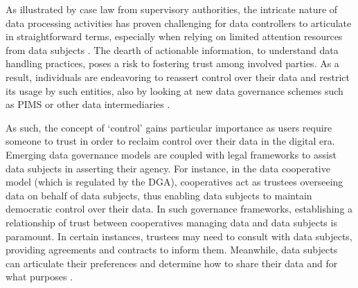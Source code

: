 As illustrated by case law from supervisory authorities, the intricate nature of data processing activities has proven challenging for data controllers to articulate in straightforward terms, especially when relying on limited attention resources from data subjects \citep{european_data_protection_board_guidelines_2020}.
The dearth of actionable information, to understand data handling practices, poses a risk to fostering trust among involved parties.
As a result, individuals are endeavoring to reassert control over their data and restrict its usage by such entities, also by looking at new data governance schemes such as PIMS or other data intermediaries \citep{craglia_digitranscope_2021,papagiannakopoulou_leveraging_2014}. 

As such, the concept of `control' gains particular importance as users require someone to trust in order to reclaim control over their data in the digital era.
Emerging data governance models are coupled with legal frameworks to assist data subjects in asserting their agency.
For instance, in the data cooperative model (which is regulated by the DGA), cooperatives act as trustees overseeing data on behalf of data subjects, thus enabling data subjects to maintain democratic control over their data. 
In such governance frameworks, establishing a relationship of trust between cooperatives managing data and data subjects is paramount.
In certain instances, trustees may need to consult with data subjects, providing agreements and contracts to inform them. 
Meanwhile, data subjects can articulate their preferences and determine how to share their data and for what purposes \citep{craglia_digitranscope_2021}.

